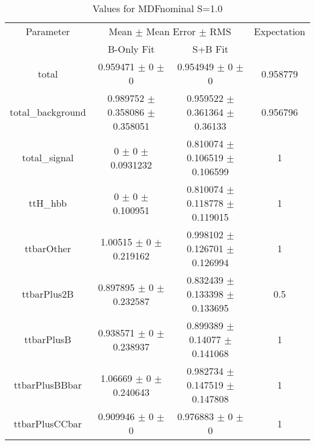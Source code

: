 \begin{table}
\centering
\caption{Values for MDFnominal S=1.0}
\begin{tabular}{cccc}
\toprule
Parameter & \multicolumn{2}{c}{Mean $\pm$ Mean Error $\pm$ RMS} & Expectation\\
 & B-Only Fit & S+B Fit & \\
\midrule
total & \num{0.959471} $\pm$ \num{0} $\pm$ \num{0} & \num{0.954949} $\pm$ \num{0} $\pm$ \num{0} & \num{0.958779}\\
total\_background & \num{0.989752} $\pm$ \num{0.358086} $\pm$ \num{0.358051} & \num{0.959522} $\pm$ \num{0.361364} $\pm$ \num{0.36133} & \num{0.956796}\\
total\_signal & \num{0} $\pm$ \num{0} $\pm$ \num{0.0931232} & \num{0.810074} $\pm$ \num{0.106519} $\pm$ \num{0.106599} & \num{1}\\
ttH\_hbb & \num{0} $\pm$ \num{0} $\pm$ \num{0.100951} & \num{0.810074} $\pm$ \num{0.118778} $\pm$ \num{0.119015} & \num{1}\\
ttbarOther & \num{1.00515} $\pm$ \num{0} $\pm$ \num{0.219162} & \num{0.998102} $\pm$ \num{0.126701} $\pm$ \num{0.126994} & \num{1}\\
ttbarPlus2B & \num{0.897895} $\pm$ \num{0} $\pm$ \num{0.232587} & \num{0.832439} $\pm$ \num{0.133398} $\pm$ \num{0.133695} & \num{0.5}\\
ttbarPlusB & \num{0.938571} $\pm$ \num{0} $\pm$ \num{0.238937} & \num{0.899389} $\pm$ \num{0.14077} $\pm$ \num{0.141068} & \num{1}\\
ttbarPlusBBbar & \num{1.06669} $\pm$ \num{0} $\pm$ \num{0.240643} & \num{0.982734} $\pm$ \num{0.147519} $\pm$ \num{0.147808} & \num{1}\\
ttbarPlusCCbar & \num{0.909946} $\pm$ \num{0} $\pm$ \num{0} & \num{0.976883} $\pm$ \num{0} $\pm$ \num{0} & \num{1}\\
\bottomrule
\end{tabular}
\end{table}